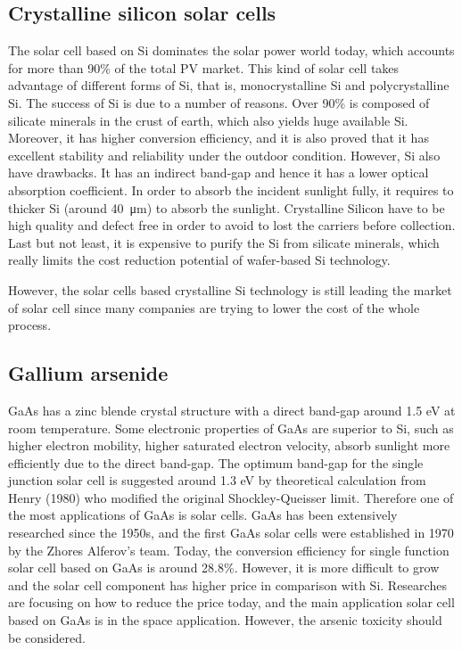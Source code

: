 \documentclass[a4paper, 12pt, titlepage,oneside,drop]{kthesis}
\begin{document}
\subsection{Crystalline silicon solar cells}
The solar cell based on Si dominates the solar power world today, which accounts for more than 90\% of the total PV market.
This kind of solar cell takes advantage of different forms of Si, that is, monocrystalline Si and polycrystalline Si. 
The success of Si is due to a number of reasons. Over 90\% is composed of silicate minerals in the crust of earth, which also yields huge available Si. Moreover, it has higher conversion efficiency, and it is also proved that 
it has excellent stability and reliability under the outdoor condition. However, Si also have drawbacks. It has an indirect band-gap and hence it has a lower optical absorption coefficient. In order to absorb the incident sunlight fully, 
it requires to thicker Si (around \SI{40} {\micro\meter}) to absorb the sunlight. Crystalline Silicon have to be high quality and defect free in order to avoid to lost the carriers before collection. Last but not least, it is expensive to purify the Si from silicate minerals, which
really limits the cost reduction potential of wafer-based Si technology. 

However, the solar cells based crystalline Si technology is still leading the market of solar cell since many companies are trying to lower the cost of the whole process.



\subsection{Gallium arsenide}
GaAs has a zinc blende crystal structure with a direct band-gap around 1.5 eV at room temperature. Some electronic properties of GaAs are superior to Si, such as higher electron 
mobility, higher saturated electron velocity, absorb sunlight more efficiently due to the direct band-gap. The optimum band-gap for the single junction solar cell is suggested around 1.3 eV by theoretical calculation 
from Henry (1980) who modified the original Shockley-Queisser limit. Therefore one of the most applications of GaAs is solar cells. GaAs has been extensively researched since the 1950s, and the first GaAs solar cells were established in
1970 by the Zhores Alferov's team. Today, the conversion efficiency for single function solar cell based on GaAs is around 28.8\%. However, it is more difficult to grow and the solar cell component has higher price in comparison with Si.
Researches are focusing on how to reduce the price today, and the main application solar cell based on GaAs is in the space application. However, the arsenic toxicity should be considered. 
\end{document}
